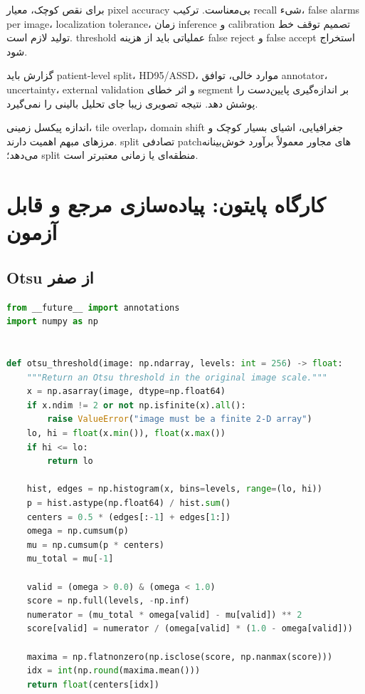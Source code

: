 \documentclass[12pt,openany,oneside]{book}
\begin{document}
\begin{applicationbox}
برای نقص کوچک، معیار pixel accuracy بی‌معناست. ترکیب recall شیء، false alarms per image، localization tolerance،
زمان inference و calibration تصمیم توقف خط تولید لازم است. threshold عملیاتی باید از هزینه false reject و false accept
استخراج شود.
\end{applicationbox}

\begin{applicationbox}
گزارش باید patient-level split، HD95/ASSD، موارد خالی، توافق annotator، uncertainty، external validation و اثر خطای
segment بر اندازه‌گیری پایین‌دست را پوشش دهد. نتیجه تصویری زیبا جای تحلیل بالینی را نمی‌گیرد.
\end{applicationbox}

\begin{applicationbox}
اندازه پیکسل زمینی، tile overlap، domain shift جغرافیایی، اشیای بسیار کوچک و مرزهای مبهم اهمیت دارند. split تصادفی
patchهای مجاور معمولاً برآورد خوش‌بینانه می‌دهد؛ split منطقه‌ای یا زمانی معتبرتر است.
\end{applicationbox}

\section{کارگاه پایتون: پیاده‌سازی مرجع و قابل آزمون}
\subsection{Otsu از صفر}
\begin{latin}
\begin{lstlisting}[language=Python]
from __future__ import annotations
import numpy as np


def otsu_threshold(image: np.ndarray, levels: int = 256) -> float:
    """Return an Otsu threshold in the original image scale."""
    x = np.asarray(image, dtype=np.float64)
    if x.ndim != 2 or not np.isfinite(x).all():
        raise ValueError("image must be a finite 2-D array")
    lo, hi = float(x.min()), float(x.max())
    if hi <= lo:
        return lo

    hist, edges = np.histogram(x, bins=levels, range=(lo, hi))
    p = hist.astype(np.float64) / hist.sum()
    centers = 0.5 * (edges[:-1] + edges[1:])
    omega = np.cumsum(p)
    mu = np.cumsum(p * centers)
    mu_total = mu[-1]

    valid = (omega > 0.0) & (omega < 1.0)
    score = np.full(levels, -np.inf)
    numerator = (mu_total * omega[valid] - mu[valid]) ** 2
    score[valid] = numerator / (omega[valid] * (1.0 - omega[valid]))

    maxima = np.flatnonzero(np.isclose(score, np.nanmax(score)))
    idx = int(np.round(maxima.mean()))
    return float(centers[idx])
\end{lstlisting}
\end{latin}
\end{document}

